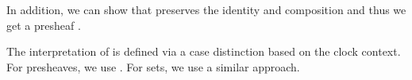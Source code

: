{\begin{code}
\AgdaSymbol{\}}\AgdaSpace{}%
\AgdaSymbol{=}\AgdaSpace{}%
\AgdaSpace{}%
\AgdaSpace{}%
\AgdaSpace{}%
\AgdaSymbol{(}\AgdaSpace{}%
\AgdaSpace{}%
\AgdaSymbol{\{}\AgdaSpace{}%
\AgdaOperator{\AgdaInductiveConstructor{[}}\AgdaSpace{}%
\AgdaSpace{}%
\AgdaOperator{\AgdaInductiveConstructor{]}}\AgdaSpace{}%
\AgdaSpace{}%
\AgdaSpace{}%
\AgdaSpace{}%
\AgdaSymbol{\{}\AgdaSpace{}%
\AgdaOperator{\AgdaInductiveConstructor{[}}\AgdaSpace{}%
\AgdaSpace{}%
\AgdaOperator{\AgdaInductiveConstructor{]}}\AgdaSpace{}%
\AgdaSpace{}%
\AgdaSpace{}%
\AgdaSymbol{\})}\AgdaSpace{}%
\AgdaSymbol{\}))}\<%
\end{code}
}

In addition, we can show that  preserves the identity and composition and thus we get a presheaf .
\begin{code}%
\>[0]\AgdaSpace{}%
\AgdaSymbol{:}\AgdaSpace{}%
\AgdaSpace{}%
\AgdaSpace{}%
\AgdaSpace{}%
\AgdaSpace{}%
\AgdaSpace{}%
\AgdaSpace{}%
\AgdaSpace{}%
\<%
\end{code}
The interpretation of  is defined via a case distinction based on the clock context.
For presheaves, we use   .
For sets, we use a similar approach.

